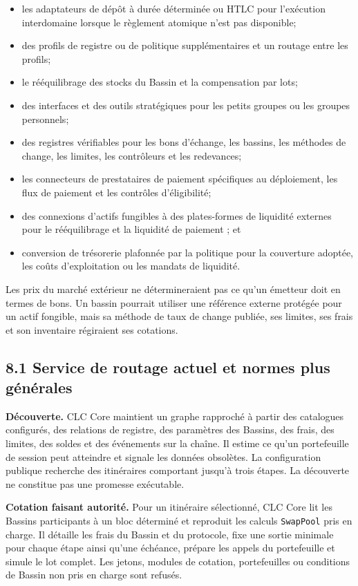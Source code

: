 \documentclass[11pt]{article}
\begin{document}
\begin{itemize}[leftmargin=*]
\item les adaptateurs de dépôt à durée déterminée ou HTLC pour l'exécution interdomaine lorsque le règlement atomique n'est pas disponible;
\item des profils de registre ou de politique supplémentaires et un routage entre les profils;
\item le rééquilibrage des stocks du Bassin et la compensation par lots;
\item des interfaces et des outils stratégiques pour les petits groupes ou les groupes personnels;
\item des registres vérifiables pour les bons d'échange, les bassins, les méthodes de change, les limites, les contrôleurs et les redevances;
\item les connecteurs de prestataires de paiement spécifiques au déploiement, les flux de paiement et les contrôles d'éligibilité;
\item des connexions d'actifs fungibles à des plates-formes de liquidité externes pour le rééquilibrage et la liquidité de paiement ; et
\item conversion de trésorerie plafonnée par la politique pour la couverture adoptée, les coûts d'exploitation ou les mandats de liquidité.
\end{itemize}
Les prix du marché extérieur ne détermineraient pas ce qu'un émetteur doit en termes de bons. Un bassin pourrait utiliser une référence externe protégée pour un actif fongible, mais sa méthode de taux de change publiée, ses limites, ses frais et son inventaire régiraient ses cotations.

\subsection*{8.1 Service de routage actuel et normes plus générales}

\textbf{Découverte.} CLC Core maintient un graphe rapproché à partir des catalogues configurés, des relations de registre, des paramètres des Bassins, des frais, des limites, des soldes et des événements sur la chaîne. Il estime ce qu'un portefeuille de session peut atteindre et signale les données obsolètes. La configuration publique recherche des itinéraires comportant jusqu'à trois étapes. La découverte ne constitue pas une promesse exécutable.

\textbf{Cotation faisant autorité.} Pour un itinéraire sélectionné, CLC Core lit les Bassins participants à un bloc déterminé et reproduit les calculs \texttt{SwapPool} pris en charge. Il détaille les frais du Bassin et du protocole, fixe une sortie minimale pour chaque étape ainsi qu'une échéance, prépare les appels du portefeuille et simule le lot complet. Les jetons, modules de cotation, portefeuilles ou conditions de Bassin non pris en charge sont refusés.
\end{document}

